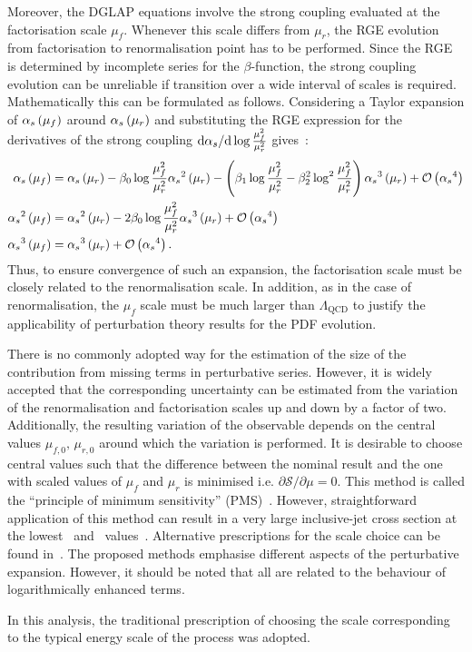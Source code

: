 Moreover, the DGLAP equations involve the strong coupling evaluated at the factorisation scale $\mu_f$. Whenever this scale differs from $\mu_r$, the RGE evolution from factorisation to renormalisation point has to be performed. Since the RGE is determined by incomplete series for the $\beta$-function, the strong coupling evolution can be unreliable if transition over a wide interval of scales is required. Mathematically this can be formulated as follows. Considering a Taylor expansion of $\mbox{$\alpha_{s}$}\left(\mu_f\right)$ around $\mbox{$\alpha_{s}$}\left(\mu_r\right)$ and substituting the RGE expression for the derivatives of the strong coupling $\mathrm{d}\mbox{$\alpha_{s}$}/\mathrm{d}\log{\frac{\mu_f^2}{\mu_r^2}}$ gives~\cite{Botje:2010ay}:
{\small
\begin{align}
 \mbox{$\alpha_{s}$}\left(\mu_f\right) &= \mbox{$\alpha_{s}$}\left(\mu_r\right) - \beta_0\log{\frac{\mu_f^2}{\mu_r^2}}\mbox{$\alpha_{s}$}^2\left(\mu_r\right) - \left(\beta_1\log{\frac{\mu_f^2}{\mu_r^2}} - \beta_2^2\log^2{\frac{\mu_f^2}{\mu_r^2}}\right)\mbox{$\alpha_{s}$}^3\left(\mu_r\right) + \mathcal{O}\left(\mbox{$\alpha_{s}$}^4\right)\\ \nonumber
 \mbox{$\alpha_{s}$}^2\left(\mu_f\right) & = \mbox{$\alpha_{s}$}^2\left(\mu_r\right) - 2\beta_0\log{\frac{\mu_f^2}{\mu_r^2}}\mbox{$\alpha_{s}$}^3\left(\mu_r\right) + \mathcal{O}\left(\mbox{$\alpha_{s}$}^4\right)\\
\mbox{$\alpha_{s}$}^3\left(\mu_f\right) & = \mbox{$\alpha_{s}$}^3\left(\mu_r\right) + \mathcal{O}\left(\mbox{$\alpha_{s}$}^4\right).
\end{align}
}
Thus, to ensure convergence of such an expansion, the factorisation scale must be closely related to the renormalisation scale. In addition, as in the case of renormalisation, the $\mu_f$ scale must be much larger than $\Lambda_\mathrm{QCD}$ to justify the applicability of perturbation theory results for the PDF evolution.

There is no commonly adopted way for the estimation of the size of the contribution from missing terms in perturbative series. However, it is widely accepted that the corresponding uncertainty can be estimated from the variation of the renormalisation and factorisation scales up and down by a factor of two. Additionally, the resulting variation of the observable depends on the central values $\mu_{f,0},\,\mu_{r,0}$ around which the variation is performed. It is desirable to choose central values such that the difference between the nominal result and the one with scaled values of $\mu_f$ and $\mu_r$ is minimised i.e. $\partial\mathcal{S}/\partial\mu=0$. This method is called the ``principle of minimum sensitivity'' (PMS)~\cite{Stevenson:1980du}. However, straightforward application of this method can result in a very large inclusive-jet cross section at the lowest \qsq~and \etjet~values~\cite{thesis:britzger:2013}. Alternative prescriptions for the scale choice can be found in~\cite{Ioffe:2010zz}. The proposed methods emphasise different aspects of the perturbative expansion. However, it should be noted that all are related to the behaviour of logarithmically enhanced terms.

In this analysis, the traditional prescription of choosing the scale corresponding to the typical energy scale of the process was adopted.
